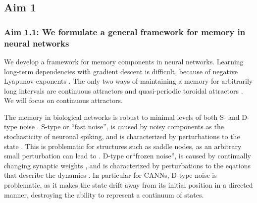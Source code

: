 \documentclass[12pt,letterpaper, onecolumn]{article}
\theoremstyle{definition}
\theoremstyle{remark}
\begin{document}
\subsection*{Aim 1}

\subsubsection*{Aim 1.1: We formulate a general framework for memory in neural networks}

We develop a framework for memory components in neural networks.
Learning long-term dependencies with gradient descent is difficult, because of negative Lyapunov exponents \citep{bengio1994learning, orvieto2023b}.
The only two ways of maintaining a memory for arbitrarily long intervals are continuous attractors and quasi-periodic toroidal attractors \citep{Park2023a}.
We will focus on continuous attractors. %

The memory in biological networks is robust to minimal levels of both S- and D-type noise \citep{Park2023a}.
S-type or ``fast noise'', is caused by noisy components as the stochasticity of neuronal spiking, and is characterized by perturbations to the state \citep{panichello2019, burak2012}.
This is problematic for structures such as saddle nodes, as an arbitrary small perturbation can lead to .
D-type or``frozen noise'', is caused by continually changing synaptic weights \citep{flesch2023continual}, and is characterized by perturbations to the eqations that describe the dynamics \citep{seeholzer2019, laje2013, flesch2022}.
In particular for CANNs, D-type noise is problematic, as it makes the state drift away from its initial position in a directed manner, destroying the ability to represent a continuum of states.
\end{document}
